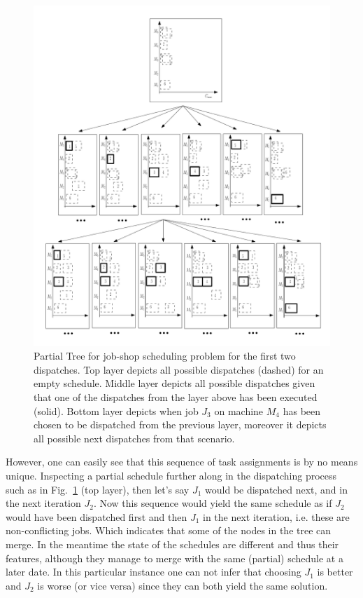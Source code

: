 \documentclass[smallextended]{llncs}
\begin{document}
\begin{figure}[b!]
\includegraphics[width=\columnwidth]{gametree}
\caption[Partial Game Tree for JSP]{Partial Tree for job-shop scheduling problem for the first two dispatches. 
Top layer depicts all possible dispatches (dashed) for an empty schedule. 
Middle layer depicts all possible dispatches given that one of the dispatches from the layer above has been executed 
(solid). 
Bottom layer depicts when job $J_3$ on machine $M_4$ has been chosen to be dispatched from the previous layer, 
moreover it depicts all possible next dispatches from that scenario.}
\label{fig:jssp:gametree}
\end{figure}


However, one can easily see that this sequence of task assignments is by no means unique. Inspecting a partial 
schedule further along in the dispatching process such as in Fig.~\ref{fig:jssp:gametree} (top layer), then let's say 
$J_1$ 
would be dispatched next, and in the next iteration $J_2$. Now this sequence would yield the same schedule as if $J_2$ 
would have been dispatched first and then $J_1$ in the next iteration, i.e. these are non-conflicting jobs. Which 
indicates that some of the nodes in the tree can merge. In the meantime the state of the schedules are different and 
thus their features, although they manage to merge with the same (partial) schedule at a later date.  %
In this particular instance one can not infer that choosing $J_1$ is better and $J_2$ is worse (or vice versa) since they can both yield the same solution.
\end{document}
